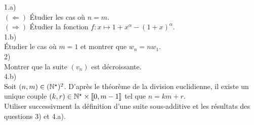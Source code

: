 \begin{solution}
    1.a)\\ 
    \indent $(\Leftarrow)$ Étudier les cas où $n=m$.\\
    \indent $(\Rightarrow)$ Étudier la fonction $f:x \mapsto 1+x^{\alpha} - (1+x)^{\alpha}$.\\
    1.b)\\
    \indent Étudier le cas où $m=1$ et montrer que $w_n = n w_1$.\\
    2)\\
    \indent Montrer que la suite $(v_n)$ est décroissante.\\ 
    4.b)\\
    \indent Soit $(n, m) \in (\mathbb{N}^\star)^2$. D'après le théorème de la division euclidienne, il existe un unique couple $(k, r) \in \mathbb{N}^\star \times \llbracket0, m-1 \rrbracket$ tel que $n=km+r$.\\
    \indent Utiliser successivment la définition d'une suite sous-additive et les résultats des questions 3) et 4.a).
\end{solution}

